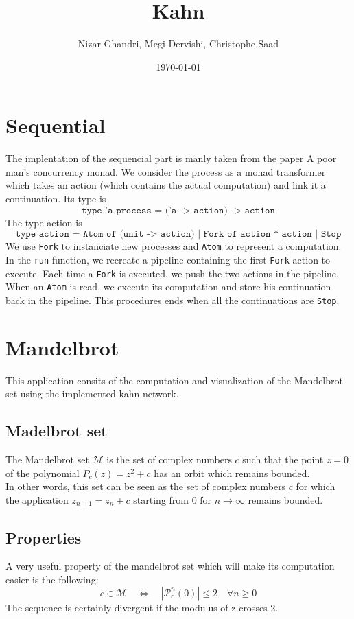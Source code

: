 \documentclass{article}
\title{Kahn}
\author{Nizar Ghandri, Megi Dervishi, Christophe Saad}
\date{\today}
\begin{document}
\maketitle

\section{Sequential}
The implentation of the sequencial part is manly taken from the paper  A poor man’s concurrency monad. We consider the process as a monad transformer which takes an action (which contains the actual computation) and link it a continuation. Its type is $$\texttt{type 'a process = ('a -> action) -> action}$$
The type action is $$\texttt{type action  = Atom of (unit -> action) | Fork of action * action | Stop}$$
We use \texttt{Fork} to instanciate new processes and \texttt{Atom} to represent a computation.\\
In the \texttt{run} function, we recreate a pipeline containing the first \texttt{Fork} action to execute. Each time a \texttt{Fork} is executed, we push the two actions in the pipeline. When an \texttt{Atom} is read, we execute its computation and store his continuation back in the pipeline. This procedures ends when all the continuations are \texttt{Stop}.

\section{Mandelbrot}
This application consits of the computation and visualization of the Mandelbrot set using the implemented kahn network.
\subsection{Madelbrot set}
The Mandelbrot set $\mathcal{M}$ is the set of complex numbers $c$ such that the point $z = 0$ of the polynomial $P_c(z) = z^2 + c$ has an orbit which remains bounded. \\
In other words, this set can be seen as the set of complex numbers $c$ for which the application $z_{n+1} = z_n + c$ starting from $0$ for $n \rightarrow \infty$ remains bounded.

\subsection{Properties}
A very useful property of the mandelbrot set which will make its computation easier is the following:
	$$c \in \mathcal{M}  \quad \Longleftrightarrow \quad |\mathcal{P}^n_c(0)| \leq 2 \quad \forall n\geq 0$$
The sequence is certainly divergent if the modulus of z crosses 2.
\end{document}
